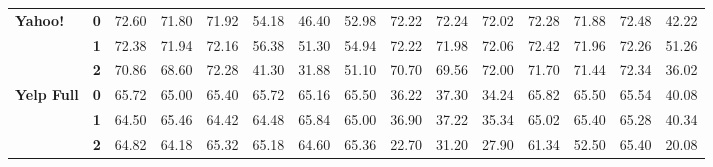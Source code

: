 \begin{sidewaystable*}[h]
\begin{tabular*}{\columnwidth}{l@{\extracolsep{\fill}}lccccccccccccc}
		\hline
		\multirow{3}{*}{\textbf{Yahoo!}}     & \textbf{0} & 72.60                          & 71.80                          & 71.92                          & 54.18                          & 46.40                          & 52.98                          & 72.22                          & 72.24                          & 72.02                          & 72.28                          & 71.88                          & 72.48                          & 42.22                              \\
		& \textbf{1} & 72.38                          & 71.94                          & 72.16                          & 56.38                          & 51.30                          & 54.94                          & 72.22                          & 71.98                          & 72.06                          & 72.42                          & 71.96                          & 72.26                          & 51.26                              \\
		& \textbf{2} & 70.86                          & 68.60                          & 72.28                          & 41.30                          & 31.88                          & 51.10                          & 70.70                          & 69.56                          & 72.00                          & 71.70                          & 71.44                          & 72.34                          & 36.02                              \\
		\hline
		\multirow{3}{*}{\textbf{Yelp Full}} & \textbf{0} & 65.72                          & 65.00                          & 65.40                          & 65.72                          & 65.16                          & 65.50                          & 36.22                          & 37.30                          & 34.24                          & 65.82                          & 65.50                          & 65.54                          & 40.08                              \\
		& \textbf{1} & 64.50                          & 65.46                          & 64.42                          & 64.48                          & 65.84                          & 65.00                          & 36.90                          & 37.22                          & 35.34                          & 65.02                          & 65.40                          & 65.28                          & 40.34                              \\
		& \textbf{2} & 64.82                          & 64.18                          & 65.32                          & 65.18                          & 64.60                          & 65.36                          & 22.70                          & 31.20                          & 27.90                          & 61.34                          & 52.50                          & 65.40                          & 20.08                              \\

\end{tabular*}
\end{sidewaystable*}
